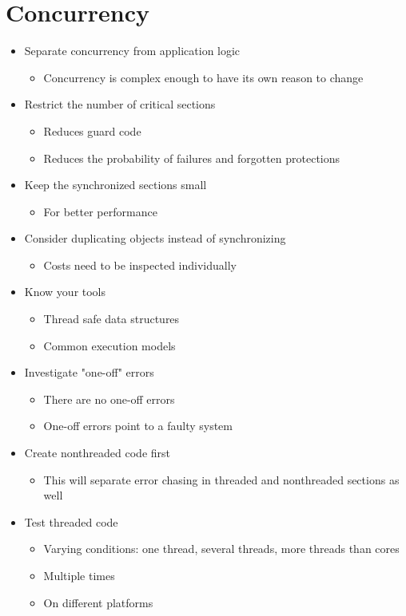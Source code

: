 
\section{Concurrency}
\begin{itemize}
    \item Separate concurrency from application logic
    \begin{itemize}
        \item Concurrency is complex enough to have its own reason to change
    \end{itemize}
    \item Restrict the number of critical sections
    \begin{itemize}
        \item Reduces guard code
        \item Reduces the probability of failures and forgotten protections
    \end{itemize}
    \item Keep the synchronized sections small
    \begin{itemize}
        \item For better performance
    \end{itemize}
    \item Consider duplicating objects instead of synchronizing
    \begin{itemize}
        \item Costs need to be inspected individually
    \end{itemize}
    \item Know your tools
    \begin{itemize}
        \item Thread safe data structures
        \item Common execution models
    \end{itemize}
    \item Investigate "one-off" errors
    \begin{itemize}
        \item There are no one-off errors
        \item One-off errors point to a faulty system
    \end{itemize}
    \item Create nonthreaded code first
    \begin{itemize}
        \item This will separate error chasing in threaded and nonthreaded sections as well
    \end{itemize}
    \item Test threaded code
    \begin{itemize}
        \item Varying conditions: one thread, several threads, more threads than cores
        \item Multiple times
        \item On different platforms
    \end{itemize}
\end{itemize}